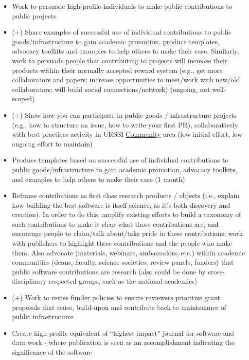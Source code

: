 \documentclass[
]{book}
\begin{document}
\begin{itemize}
\item
  Work to persuade high-profile individuals to make public contributions to public projects
\item
  (+) Share examples of successful use of individual contributions to public goods/infrastructure
  to gain academic promotion, produce templates, advocacy toolkits and examples to help others
  to make their case. Similarly, work to persuade people that contributing to projects will
  increase their products within their normally accepted reward system (e.g., get more collaborators
  and papers; increase opportunities to meet/work with new/old collaborators; will build social
  connections/network) (ongoing, not well-scoped)
\item
  (+) Show how you can participate in public goods / infrastructure projects (e.g., how to
  structure an issue, how to write your first PR), collaboratively with best practices activity in
  URSSI \protect\hyperlink{Ch-Comm}{Community} area (low initial effort, low ongoing effort to maintain)
\item
  Produce templates based on successful use of individual contributions to public
  goods/infrastructure to gain academic promotion, advocacy toolkits, and examples to help
  others to make their case (1 month)
\item
  Reframe contributions as first class research products / objects (i.e., explain how building
  the best software is itself science, as it's both discovery and creation). In order to do this,
  amplify existing efforts to build a taxonomy of such contributions to make it clear what those
  contributions are, and encourage people to claim/talk about/take pride in these contributions;
  work with publishers to highlight these contributions and the people who make them. Also advocate
  (materials, webinars, ambassadors, etc.) within academic communities (deans, faculty, science
  societies, review panels, funders) that public software contributions are research (also could
  be done by cross-disciplinary respected groups, such as the national academies)
\item
  (+) Work to revise funder policies to ensure reviewers prioritize grant proposals that reuse,
  build-upon and contribute back to maintenance of public infrastructure
\item
  Create high-profile equivalent of ``highest impact'' journal for software and data work - where publication
  is seen as an accomplishment indicating the significance of the software
\end{itemize}
\end{document}

